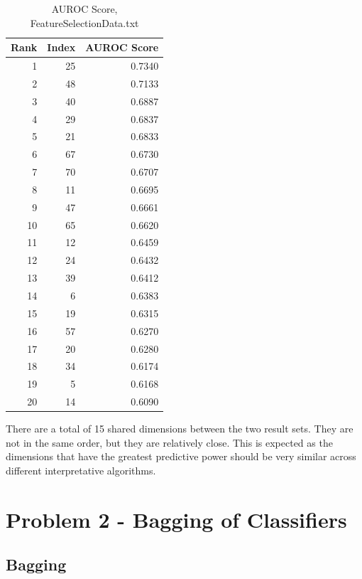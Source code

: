 \documentclass[12pt, letterpaper]{report}
\begin{document}
\begin{table}[H]
	\centering
	\begin{tabular}{ |r|r|r| }
		\hline
		\textbf{Rank} & \textbf{Index} & \textbf{AUROC Score} \\
		\hline
		1 & 25 & 0.7340 \\
		\hline
		2 & 48 & 0.7133 \\
		\hline
		3 & 40 & 0.6887 \\
		\hline
		4 & 29 & 0.6837 \\
		\hline
		5 & 21 & 0.6833 \\
		\hline		
		6 & 67 & 0.6730 \\
		\hline
		7 & 70 & 0.6707 \\
		\hline
		8 & 11 & 0.6695 \\
		\hline
		9 & 47 & 0.6661 \\
		\hline
		10 & 65 & 0.6620 \\
		\hline
		11 & 12 & 0.6459 \\
		\hline
		12 & 24 & 0.6432 \\
		\hline
		13 & 39 & 0.6412 \\
		\hline
		14 & 6 & 0.6383 \\
		\hline
		15 & 19 & 0.6315 \\
		\hline
		16 & 57 & 0.6270 \\
		\hline
		17 & 20 & 0.6280 \\
		\hline
		18 & 34 & 0.6174 \\
		\hline
		19 & 5 & 0.6168 \\
		\hline
		20 & 14 & 0.6090 \\
		\hline
	\end{tabular}
	\caption{AUROC Score, FeatureSelectionData.txt}
\end{table}


There are a total of 15 shared dimensions between the two result sets. They are not in the same order, but they are relatively close. This is expected as the dimensions that have the greatest predictive power should be very similar across different interpretative algorithms.


\section{Problem 2 - Bagging of Classifiers}

\subsection{Bagging}
\end{document}
